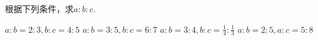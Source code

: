 根据下列条件，求$a:b:c$.
\begin{subquestions}
    \subquestion$a:b=2:3,b:c=4:5$   
    \subquestion$a:b=3:5,b:c=6:7$  
    \subquestion$a:b=3:4,b:c=\frac{1}{4}:\frac{1}{3}$  
    \subquestion$a:b=2:5,a:c=5:8$  
\end{subquestions}